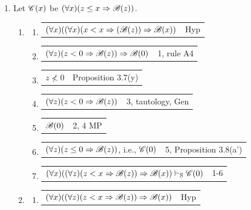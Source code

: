 \begin{enumerate} [label = \alph*.]
    \item Let $\mathscr{C}(x)$ be $(\forall x)(z \leq x \Rightarrow \mathscr{B}(z))$.
    \begin{enumerate} [label = \roman*.]
        \item \begin{enumerate} [label = \arabic*.]
            \item \begin{tabular}{p{8cm} r}
                $(\forall x)((\forall x)(x < x \Rightarrow (\mathscr{B}(z)) \Rightarrow \mathscr{B}(x))$ & Hyp
                \end{tabular}
            \item \begin{tabular}{p{8cm} r}
                $(\forall z)(z < 0 \Rightarrow \mathscr{B}(z)) \Rightarrow \mathscr{B}(0)$ & 1, rule A4
                \end{tabular}
            \item \begin{tabular}{p{8cm} r}
                $z \not < 0$ & Proposition 3.7(y)
                \end{tabular}
            \item \begin{tabular}{p{8cm} r}
                $(\forall z)(z < 0 \Rightarrow \mathscr{B}(z))$ & 3, tautology, Gen
                \end{tabular}
            \item \begin{tabular}{p{8cm} r}
                $\mathscr{B}(0)$ & 2, 4 MP
                \end{tabular}
            \item \begin{tabular}{p{8cm} r}
                $(\forall z)(z \leq 0 \Rightarrow \mathscr{B}(z))$, i.e., $\mathscr{C}(0)$ & 5, Proposition 3.8(a')
                \end{tabular}
            \item \begin{tabular}{p{8cm} r}
                $(\forall x)((\forall z)(z < x \Rightarrow \mathscr{B}(z)) \Rightarrow \mathscr{B}(x)) \vdash_\text{S} \mathscr{C}(0)$ & 1-6
                \end{tabular}
        \end{enumerate}
        \item \begin{enumerate} [label = \arabic*.]
            \item \begin{tabular}{p{8cm} r}
                $(\forall x)((\forall z)(z < x \Rightarrow \mathscr{B}(z)) \Rightarrow \mathscr{B}(x))$ & Hyp

\end{tabular}
\end{enumerate}
\end{enumerate}
\end{enumerate}
